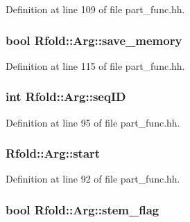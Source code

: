 Definition at line 109 of file part\+\_\+func.\+hh.

\hypertarget{class_rfold_1_1_arg_a4baebf9ebff2c466c56e5e377cccd360}{
\subsubsection[{save\+\_\+memory}]{\setlength{\rightskip}{0pt plus 5cm}bool Rfold\+::\+Arg\+::save\+\_\+memory}}\label{class_rfold_1_1_arg_a4baebf9ebff2c466c56e5e377cccd360}


Definition at line 115 of file part\+\_\+func.\+hh.

\hypertarget{class_rfold_1_1_arg_a7e5e99f9fa61d2b7fe2d03d212f075d3}{
\subsubsection[{seq\+I\+D}]{\setlength{\rightskip}{0pt plus 5cm}int Rfold\+::\+Arg\+::seq\+I\+D}}\label{class_rfold_1_1_arg_a7e5e99f9fa61d2b7fe2d03d212f075d3}


Definition at line 95 of file part\+\_\+func.\+hh.

\hypertarget{class_rfold_1_1_arg_afe6c58f953e12b4964a7c14b78ee731e}{
\subsubsection[{start}]{ Rfold\+::\+Arg\+::start}}\label{class_rfold_1_1_arg_afe6c58f953e12b4964a7c14b78ee731e}


Definition at line 92 of file part\+\_\+func.\+hh.

\hypertarget{class_rfold_1_1_arg_aa67a67820097b91b6376581ae28ee481}{
\subsubsection[{stem\+\_\+flag}]{\setlength{\rightskip}{0pt plus 5cm}bool Rfold\+::\+Arg\+::stem\+\_\+flag}}\label{class_rfold_1_1_arg_aa67a67820097b91b6376581ae28ee481}


